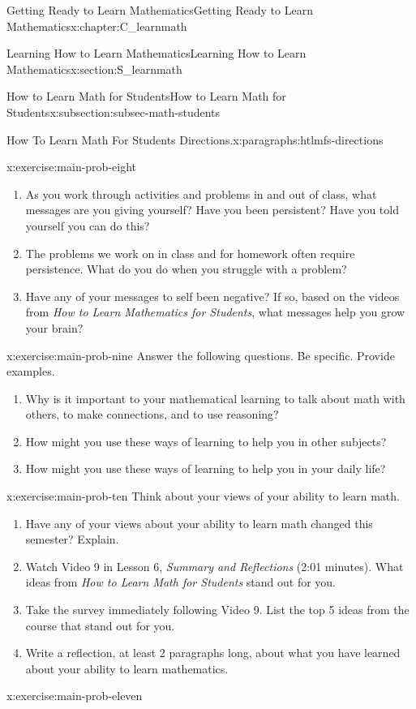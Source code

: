 \documentclass[oneside,10pt,]{book}
\newcommand{\pubtitle}[1]{\textsl{#1}}
\numberwithin{equation}{chapter}
\begin{document}
\begin{chapterptx}{Getting Ready to Learn Mathematics}{}{Getting Ready to Learn Mathematics}{}{}{x:chapter:C_learnmath}
\begin{sectionptx}{Learning How to Learn Mathematics}{}{Learning How to Learn Mathematics}{}{}{x:section:S_learnmath}
\begin{subsectionptx}{How to Learn Math for Students}{}{How to Learn Math for Students}{}{}{x:subsection:subsec-math-students}
\begin{paragraphs}{How To Learn Math For Students Directions.}{x:paragraphs:htlmfs-directions}
\begin{inlineexercise}{}{x:exercise:main-prob-eight}
\begin{enumerate}[font=\bfseries,label=(\alph*),ref=\alph*]
\item{}As you work through activities and problems in and out of class, what messages are you giving yourself? Have you been persistent? Have you told yourself you can do this?%
\item{}The problems we work on in class and for homework often require persistence. What do you do when you struggle with a problem?%
\item{}Have any of your messages to self been negative? If so, based on the videos from \pubtitle{How to Learn Mathematics for Students}, what messages help you grow your brain?%
\end{enumerate}
\end{inlineexercise}%
\begin{inlineexercise}{}{x:exercise:main-prob-nine}%
Answer the following questions. Be specific. Provide examples.%
\begin{enumerate}[font=\bfseries,label=(\alph*),ref=\alph*]
\item{}Why is it important to your mathematical learning to talk about math with others, to make connections, and to use reasoning?%
\item{}How might you use these ways of learning to help you in other subjects?%
\item{}How might you use these ways of learning to help you in your daily life?%
\end{enumerate}
\end{inlineexercise}%
\begin{inlineexercise}{}{x:exercise:main-prob-ten}%
Think about your views of your ability to learn math.%
\begin{enumerate}[font=\bfseries,label=(\alph*),ref=\alph*]
\item{}Have any of your views about your ability to learn math changed this semester? Explain.%
\item{}Watch Video 9 in Lesson 6, \pubtitle{Summary and Reflections} (2:01 minutes). What ideas from \pubtitle{How to Learn Math for Students} stand out for you.%
\item{}Take the survey immediately following Video 9. List the top 5 ideas from the course that stand out for you.%
\item{}Write a reflection, at least 2 paragraphs long, about what you have learned about your ability to learn mathematics.%
\end{enumerate}
\end{inlineexercise}%
\begin{inlineexercise}{}{x:exercise:main-prob-eleven}%

\end{inlineexercise}
\end{paragraphs}
\end{subsectionptx}
\end{sectionptx}
\end{chapterptx}
\end{document}
